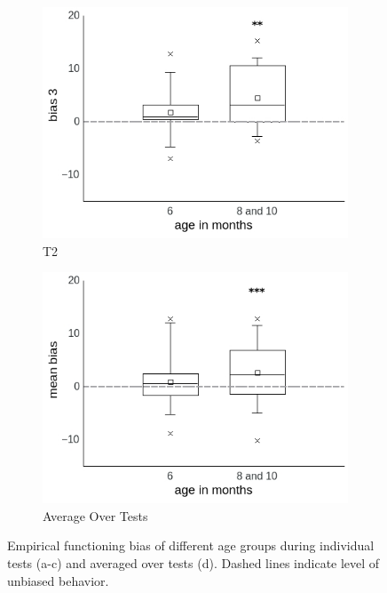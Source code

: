 \documentclass[a4paper]{scrreprt}
\begin{document}
\begin{figure}
    \begin{subfigure}[b]{0.49\textwidth}
        \includegraphics[width=\textwidth]{figs/sec3/age/age2_diff3_dat.jpeg}
        \caption{T2}
    \end{subfigure}
    \begin{subfigure}[b]{0.49\textwidth}
        \includegraphics[width=\textwidth]{figs/sec3/age/age2_diff_mean_dat.jpeg}
        \caption{Average Over Tests}
    \end{subfigure}
\caption{Empirical functioning bias of different age groups during individual tests (a-c) and averaged over tests (d). Dashed lines indicate level of unbiased behavior.}
\label{fig:age2_diff_dat}
\end{figure}
\end{document}
